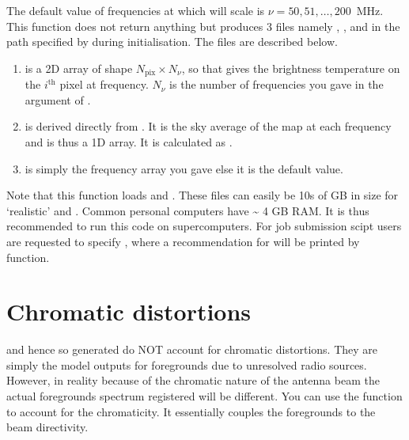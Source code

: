 \documentclass[letterpaper,10pt,english]{sphinxmanual}
\begin{document}
\sphinxAtStartPar
The default value of frequencies at which  will scale is \(\nu=50,51,\ldots,200\,\) MHz. This function does not return anything but produces 3 files namely , , and  in the path specified by  during initialisation. The files are described below.
\begin{enumerate}
%
\item {} 
\sphinxAtStartPar
{} is a 2D array of shape \(N_{\mathrm{pix}}\times N_{\nu}\), so that  gives the brightness temperature on the \(i^{\mathrm{th}}\) pixel at  frequency. \(N_{\nu}\) is the number of frequencies you gave in the argument of .

\item {} 
\sphinxAtStartPar
{} is derived directly from . It is the sky average of the map at each frequency and is thus a 1D array. It is calculated as .

\item {} 
\sphinxAtStartPar
{} is simply the frequency array you gave else it is the default value.

\end{enumerate}

\sphinxAtStartPar
Note that this function loads  and . These files can easily be 10s of GB in size for ‘realistic’  and . Common personal computers have \textasciitilde{} 4 GB RAM. It is thus recommended to run this code on supercomputers. For job submission scipt users are requested to specify ,
where a recommendation for  will be printed by  function.


\section{Chromatic distortions}
\label{\detokenize{detexp:chromatic-distortions}}
\sphinxAtStartPar
{} and hence  so generated do NOT account for chromatic distortions. They are simply the model outputs for foregrounds due to unresolved radio sources. However, in reality because of the chromatic nature of the antenna beam the actual foregrounds spectrum registered will be different. You can use the function  to account for the chromaticity. It essentially couples the foregrounds to the beam directivity.
\end{document}
